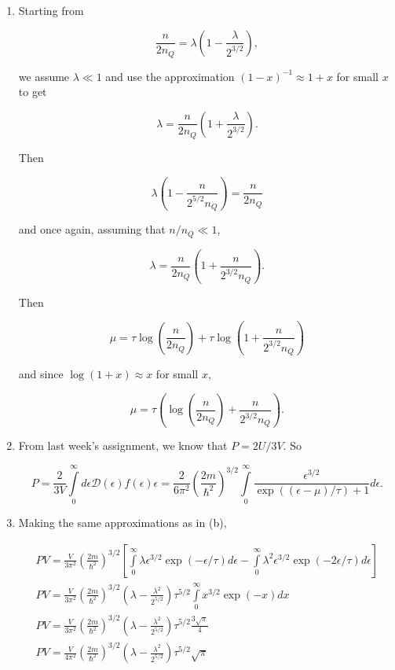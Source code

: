 \documentclass{article}
\begin{document}
\begin{enumerate}
\begin{enumerate}
		\item

		Starting from

		$$\frac{n}{2n_Q} = \lambda \left(1 - \frac{\lambda}{2^{3/2}} \right),$$

		we assume $\lambda \ll 1$ and use the approximation $(1-x)^{-1} \approx 1 + x$ for small $x$ to get

		$$\lambda = \frac{n}{2n_Q} \left(1 + \frac{\lambda}{2^{3/2}} \right).$$

		Then

		$$\lambda \left(1 - \frac{n}{2^{5/2} n_Q} \right) = \frac{n}{2n_Q}$$

		and once again, assuming that $n/n_Q \ll 1$,

		$$\lambda = \frac{n}{2n_Q} \left(1 + \frac{n}{2^{3/2} n_Q} \right).$$

		Then

		$$\mu = \tau \log \left(\frac{n}{2n_Q} \right) + \tau \log \left(1 + \frac{n}{2^{3/2} n_Q} \right)$$

		and since $\log (1+x) \approx x$ for small $x$,

		$$\mu = \tau \left( \log \left(\frac{n}{2n_Q} \right) + \frac{n}{2^{3/2} n_Q} \right).$$

		\item

		From last week's assignment, we know that $P= 2U/3V$. So

		$$P = \frac{2}{3V} \int \limits_0^\infty  d\epsilon \mathcal{D}(\epsilon) f(\epsilon) \epsilon = \frac{2}{6\pi^2} \left( \frac{2m}{\hbar^2} \right)^{3/2} \int \limits_0^\infty \frac{\epsilon^{3/2}}{\exp((\epsilon - \mu)/\tau) + 1} d\epsilon.$$

		\item

		Making the same approximations as in (b),

		\begin{gather*}
		PV = \frac{V}{3\pi^2} \left( \frac{2m}{\hbar^2} \right)^{3/2} \left[ \int \limits_0^\infty  \lambda \epsilon^{3/2}\exp(-\epsilon/\tau) d\epsilon - \int \limits_0^\infty  \lambda^2 \epsilon^{3/2}\exp(-2\epsilon/\tau) d\epsilon \right] \\
		PV = \frac{V}{3\pi^2} \left( \frac{2m}{\hbar^2} \right)^{3/2} \left(\lambda - \frac{\lambda^2}{2^{5/2}} \right) \tau^{5/2} \int \limits_0^\infty x^{3/2}\exp(-x) dx \\
		PV = \frac{V}{3\pi^2} \left( \frac{2m}{\hbar^2} \right)^{3/2} \left(\lambda - \frac{\lambda^2}{2^{5/2}} \right) \tau^{5/2} \frac{3 \sqrt{\pi}}{4} \\
		PV = \frac{V}{4\pi^2} \left( \frac{2m}{\hbar^2} \right)^{3/2} \left(\lambda - \frac{\lambda^2}{2^{5/2}} \right) \tau^{5/2} \sqrt{\pi}
		\end{gather*}


\end{enumerate}
\end{enumerate}
\end{document}
